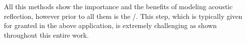 \mynewline
All this methods show the importance and the benefits of modeling acoustic reflection, however prior to all them is the \AERdef/.
This step, which is typically given for granted in the above application, is extremely challenging as shown throughout this entire work.











